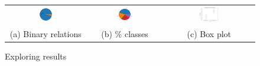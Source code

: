 \documentclass[11pt, a4paper]{article}
\begin{document}
\begin{figure}[ht]
	\centering
	\begin{tabular}{ccc}
		\includegraphics[width=0.22\textwidth]{../../img/workshop/bin_percentage.png} &
		\includegraphics[width=0.22\textwidth]{../../img/workshop/failure_percentage.png} &
		\includegraphics[width=0.22\textwidth]{../../img/workshop/box_plot.png} \\
		(a) Binary relations &
		(b) \% classes  &
		(c) Box plot \\
	\end{tabular}
	\caption{Exploring results}
	\label{res-explore}
\end{figure}
\end{document}
